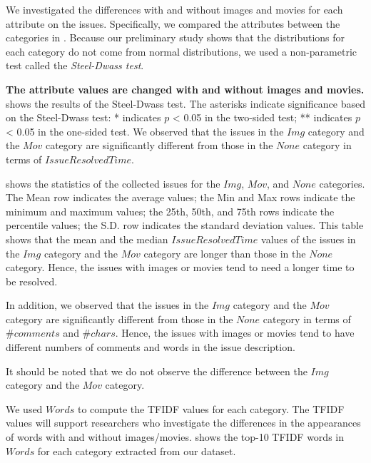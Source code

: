 


We investigated 
the differences with and without images and movies 
for each attribute on the issues. 
Specifically, we compared the attributes between 
the categories in . 
Because our preliminary study shows that 
the distributions for each category do not 
come from normal distributions, 
we used a non-parametric test called the \textit{Steel-Dwass test}. 

\textbf{The attribute values are changed 
with and without images and movies.}
 shows the results of 
the Steel-Dwass test. 
The asterisks indicate significance based on 
the Steel-Dwass test: * indicates $p$ < 0.05 in 
the two-sided test; 
** indicates $p$ < 0.05 in the one-sided test. 
We observed that the issues in the $Img$ category and 
the $Mov$ category are significantly different from those 
in the $None$ category in terms of $IssueResolvedTime$. 


 shows the statistics
of the collected issues for the $Img$, $Mov$,
and $None$ categories.
The Mean row indicates the average values; 
the Min and Max rows indicate the minimum and maximum values; 
the 25th, 50th, and 75th rows indicate the percentile values; 
the S.D. row indicates the standard deviation values. 
This table shows that 
the mean and the median $IssueResolvedTime$ values of 
the issues in the $Img$ category and the $Mov$ category are 
longer than those in the $None$ category. 
Hence, the issues with images or movies tend to need 
a longer time to be resolved. 

In addition, we observed that the issues in 
the $Img$ category and the $Mov$ category are 
significantly different from those in 
the $None$ category in terms of $\#comments$ and 
$\#chars$. 
Hence, the issues with images or movies 
tend to have different numbers of 
comments and words in the issue description.

It should be noted that we do not observe 
the difference between the $Img$ category and 
the $Mov$ category. 





We used $Words$ to compute the TFIDF values for each category. 
The TFIDF values will support researchers who investigate 
the differences in the appearances of words with and without 
images/movies. 
 shows the top-10 TFIDF words in $Words$ 
for each category extracted from our dataset. 
